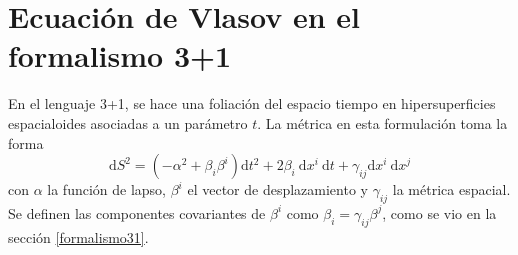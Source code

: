 \documentclass[11pt,twoside,openright,spanish]{report}
\numberwithin{equation}{chapter}
\numberwithin{figure}{chapter}
\numberwithin{table}{chapter}
\begin{document}
\section{Ecuación de Vlasov en el formalismo 3+1}
\noindent
En el lenguaje 3+1, se hace una foliación del espacio tiempo en hipersuperficies espacialoides asociadas a un parámetro $t$. La métrica en esta formulación toma la forma
\begin{equation}
\text{d}S^2=\left(-\alpha^2+\beta_i\beta^i\right)\text{d}t^2+2\beta_i\ \text{d}x^i\ \text{d}t+\gamma_{ij}\text{d}x^i\ \text{d}x^j
\end{equation}
con $\alpha$ la función de lapso, $\beta^i$ el vector de desplazamiento y $\gamma_{ij}$ la métrica espacial. Se definen las componentes covariantes de $\beta^i$ como $\beta_i=\gamma_{ij}\beta^j$, como se vio en la sección \ref{formalismo31}.
\end{document}
